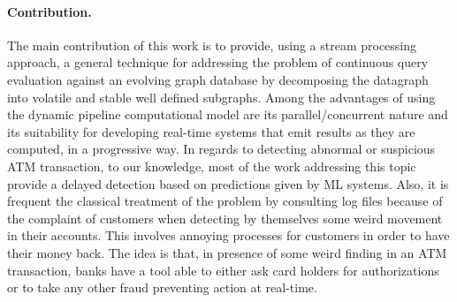 \paragraph{Contribution.} The main contribution of this work is to provide, using a stream processing approach, a general technique for addressing the problem of continuous query evaluation against an evolving graph database by decomposing the datagraph into volatile and stable well defined subgraphs. Among the advantages of using the dynamic pipeline computational model are its parallel/concurrent nature and its suitability for developing real-time systems that emit results as they are computed, in a progressive way. In regards to detecting abnormal or suspicious ATM transaction, to our knowledge, most of the work addressing this topic provide a delayed detection based on predictions given by ML systems. Also, it is frequent the classical treatment of the problem by consulting log files because of the complaint of customers when detecting by themselves some weird  movement in their accounts. This involves annoying processes for customers in order to have their money back. The idea is that, in presence of some weird  finding in an ATM transaction, banks have a tool able to either ask card holders for authorizations or to take any other fraud preventing action at real-time.